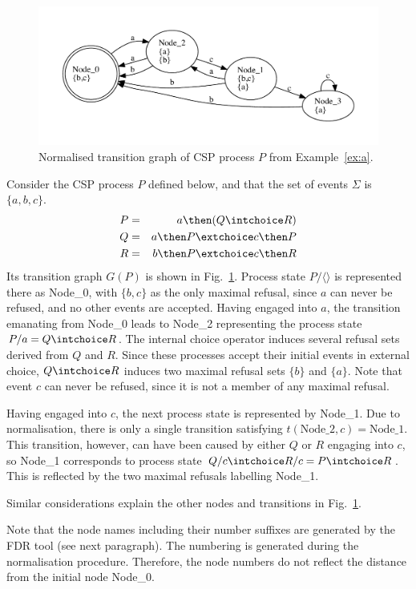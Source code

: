  \begin{figure}
 \begin{center}
\includegraphics[width=\textwidth]{q0.pdf}
\end{center}
\caption{Normalised transition graph of CSP process $P$ from Example~\ref{ex:a}.}
 \label{fig:tga}
 \end{figure}

\begin{example}\label{ex:a}
Consider the CSP process $P$ defined below, and that the set of events
$\Sigma$ is $\{a,b,c\}$.
\begin{eqnarray*}
P & = & a \then (Q\intchoice R)
\\
Q & = & a \then P \extchoice c \then P
\\
R & = & b \then P \extchoice c \then R
\end{eqnarray*}
Its transition graph $G(P)$ is shown in Fig.~\ref{fig:tga}. Process state
$P/\langle\rangle$ is represented there as Node\_0, with $\{ b,c\}$ as the
only maximal refusal, since $a$ can never be refused, and no other events are
accepted. Having engaged into $a$, the transition emanating from Node\_0
leads to Node\_2 representing  the process state $P/a = Q\intchoice R$. The
internal choice operator induces several refusal sets derived from $Q$ and
$R$. Since these processes accept their initial events in external choice,
$Q\intchoice R$ induces two maximal refusal sets $\{b\}$ and
$\{a\}$. Note that event $c$ can never be refused, since it is not a member
of any maximal refusal.

Having engaged into $c$, the next process state is represented by Node\_1.
Due to normalisation, there is only a single transition satisfying
$t(\text{Node\_2},c) = \text{Node\_1}$. This transition, however, can have
been caused by either $Q$ or $R$ engaging into $c$, so Node\_1 corresponds to
process state $Q/c \intchoice R/c = P \intchoice R$. This is reflected by the
two maximal refusals labelling Node\_1.

Similar considerations explain the other nodes and transitions in
Fig.~\ref{fig:tga}.

Note that the node names including their number suffixes 
are generated by the FDR tool (see next paragraph).
The numbering is generated   during the normalisation procedure.
Therefore, the node numbers do not reflect the distance from the initial node
Node\_0.
\end{example}


